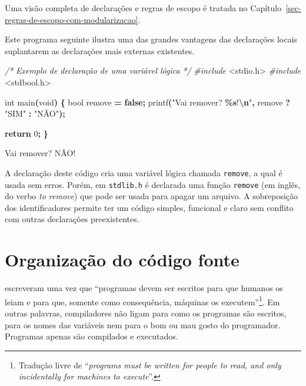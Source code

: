 \documentclass[
  11pt,
  a4paper,
]{scrbook}
\newenvironment{Shaded}{\begin{snugshade}}{\end{snugshade}}
\newcommand{\CommentTok}[1]{\textcolor[rgb]{0.56,0.35,0.01}{\textit{#1}}}
\newcommand{\ControlFlowTok}[1]{\textcolor[rgb]{0.13,0.29,0.53}{\textbf{#1}}}
\newcommand{\DataTypeTok}[1]{\textcolor[rgb]{0.13,0.29,0.53}{#1}}
\newcommand{\DecValTok}[1]{\textcolor[rgb]{0.00,0.00,0.81}{#1}}
\newcommand{\ImportTok}[1]{#1}
\newcommand{\KeywordTok}[1]{\textcolor[rgb]{0.13,0.29,0.53}{\textbf{#1}}}
\newcommand{\NormalTok}[1]{#1}
\newcommand{\OperatorTok}[1]{\textcolor[rgb]{0.81,0.36,0.00}{\textbf{#1}}}
\newcommand{\PreprocessorTok}[1]{\textcolor[rgb]{0.56,0.35,0.01}{\textit{#1}}}
\newcommand{\SpecialCharTok}[1]{\textcolor[rgb]{0.81,0.36,0.00}{\textbf{#1}}}
\newcommand{\StringTok}[1]{\textcolor[rgb]{0.31,0.60,0.02}{#1}}
\begin{document}
Uma visão completa de declarações e regras de escopo é tratada no
Capítulo~\ref{sec-regras-de-escopo-com-modularizacao}.

Este programa seguinte ilustra uma das grandes vantagens das declarações
locais suplantarem as declarações mais externas existentes.

\begin{Shaded}
\begin{Highlighting}[]
\CommentTok{/*}
\CommentTok{Exemplo de declaração de uma variável lógica}
\CommentTok{*/}
\PreprocessorTok{\#include }\ImportTok{\textless{}stdio.h\textgreater{}}
\PreprocessorTok{\#include }\ImportTok{\textless{}stdbool.h\textgreater{}}

\DataTypeTok{int}\NormalTok{ main}\OperatorTok{(}\DataTypeTok{void}\OperatorTok{)} \OperatorTok{\{}
    \DataTypeTok{bool}\NormalTok{ remove }\OperatorTok{=} \KeywordTok{false}\OperatorTok{;}
\NormalTok{    printf}\OperatorTok{(}\StringTok{"Vai remover? }\SpecialCharTok{\%s}\StringTok{!}\SpecialCharTok{\textbackslash{}n}\StringTok{"}\OperatorTok{,}\NormalTok{ remove }\OperatorTok{?} \StringTok{"SIM"} \OperatorTok{:} \StringTok{"NÃO"}\OperatorTok{);}

    \ControlFlowTok{return} \DecValTok{0}\OperatorTok{;}
\OperatorTok{\}}
\end{Highlighting}
\end{Shaded}

\begin{Shaded}
\begin{Highlighting}[]
\NormalTok{Vai remover? NÃO!}
\end{Highlighting}
\end{Shaded}

A declaração deste código cria uma variável lógica chamada
\texttt{remove}, a qual é usada sem erros. Porém, em \texttt{stdlib.h} é
declarada uma função \texttt{remove} (em inglês, do verbo \emph{to
remove}) que pode ser usada para apagar um arquivo. A sobreposição dos
identificadores permite ter um código simples, funcional e claro sem
conflito com outras declarações preexistentes.

\chapter{Organização do código
fonte}\label{sec-organizacao-do-codigo-fonte}

\textcite{abelson1996} escreveram uma vez que ``programas devem ser
escritos para que humanos os leiam e para que, somente como
consequência, máquinas os executem''\footnote{Tradução livre de
  ``\emph{programs must be written for people to read, and only
  incidentally for machines to execute}''.}. Em outras palavras,
compiladores não ligam para como os programas são escritos, para os
nomes das variáveis nem para o bom ou mau gosto do programador.
Programas apenas são compilados e executados.
\end{document}
